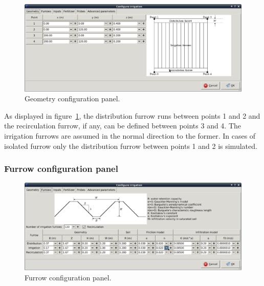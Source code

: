 \documentclass[review,authoryear]{elsarticle}
\begin{document}
\begin{figure}[!ht]
\begin{center}
\includegraphics[width=1125\UNIT]{confGeomEN.eps}
\caption{Geometry configuration panel.}\label{geomWindow}
\end{center}
\end{figure}

As displayed in figure~\ref{geomWindow}, the distribution furrow runs between
points 1 and 2 and the recirculation furrow, if any, can be defined between
points 3 and 4. The irrigation furrows are assumed in the normal direction to
the former. In cases of isolated furrow only the distribution furrow between
points 1 and 2 is simulated.

\subsubsection{Furrow configuration panel}

\begin{figure}[!ht]
\begin{center}
\includegraphics[width=1125\UNIT]{confSurcoEN.eps}
\caption{Furrow configuration panel.}\label{confSurcos}
\end{center}
\end{figure}
\end{document}
